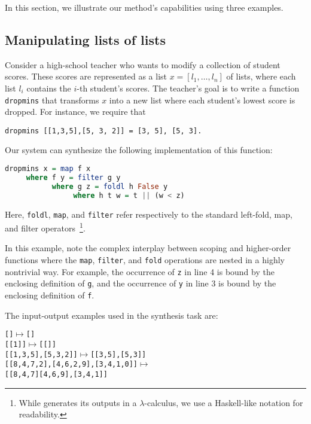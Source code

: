 In this section, we illustrate our method's capabilities using three examples.

\subsection{Manipulating lists of lists}

Consider a high-school teacher who wants to modify a collection of
student scores. These scores are represented as a list $x = [l_1,
\dots, l_n]$ of lists, where each list $l_i$ contains the $i$-th
student's scores. The teacher's goal is to write a function
\verb+dropmins+ that transforms $x$ into a new list where each
student's lowest score is dropped.  For instance, we require that

{\footnotesize
\begin{lstlisting}
dropmins [[1,3,5],[5, 3, 2]] = [3, 5], [5, 3].
\end{lstlisting}
} 

Our \sys system can synthesize the following implementation of this
function:
\begin{lstlisting}[language=Haskell]
dropmins x = map f x 
     where f y = filter g y 
           where g z = foldl h False y
                where h t w = t || (w < z)
\end{lstlisting}
Here, \verb+foldl+, \verb+map+, and \verb+filter+ refer respectively
to the standard left-fold, map, and filter operators~\footnote{While
  \sys generates its outputs in a $\lambda$-calculus, we use a
  Haskell-like notation for readability.}.

In this example, note the complex interplay between scoping and higher-order functions where
the {\tt map}, {\tt filter}, and {\tt fold} operations are nested in a
highly nontrivial way. For example, the occurrence of {\tt z} in line 4 is bound by
the enclosing definition of {\tt g}, and the occurrence of {\tt y} in
line 3 is bound by the enclosing definition of {\tt f}.

The input-output examples used in the synthesis task are: %

{\small
\begin{alltt}
[] \(\mapsto\) []
[[1]] \(\mapsto\) [[]]
[[1, 3, 5], [5, 3, 2]] \(\mapsto\) [[3, 5], [5, 3]]
[[8, 4, 7, 2], [4, 6, 2, 9], [3, 4, 1, 0]] \(\mapsto\) 
        [[8, 4, 7] [4, 6, 9], [3, 4, 1]]
\end{alltt}
}

